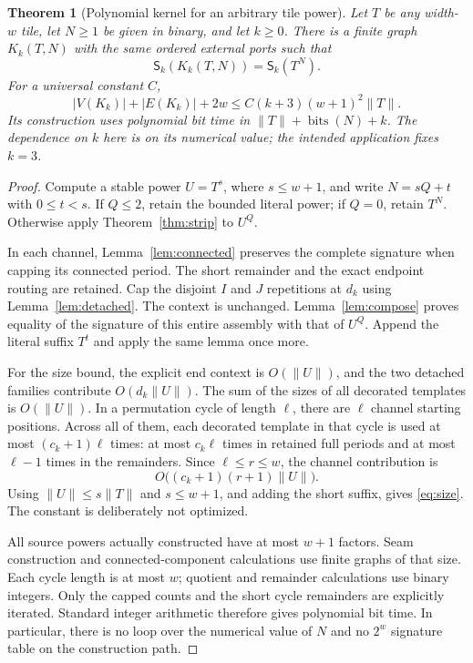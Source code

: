 \documentclass[11pt]{article}
\newtheorem{theorem}{Theorem}[section]
\theoremstyle{remark}\newtheorem{remark}[theorem]{Remark}
\newcommand{\Sig}{\mathsf S}
\newcommand{\bits}{\operatorname{bits}}
\newcommand{\size}[1]{\lVert #1\rVert}
\begin{document}
\begin{theorem}[Polynomial kernel for an arbitrary tile power]\label{thm:main}
Let $T$ be any width-$w$ tile, let $N\ge1$ be given in binary, and let $k\ge0$. There is a finite graph $K_k(T,N)$ with the same ordered external ports such that
\begin{equation}\label{eq:main}
 \boxed{\ \Sig_k(K_k(T,N))=\Sig_k(T^N).\ }
\end{equation}
For a universal constant $C$,
\begin{equation}\label{eq:size}
 |V(K_k)|+|E(K_k)|+2w
 \le C(k+3)(w+1)^2\size{T}.
\end{equation}
Its construction uses polynomial bit time in $\size{T}+\bits(N)+k$. The dependence on $k$ here is on its numerical value; the intended application fixes $k=3$.
\end{theorem}
\begin{proof}
Compute a stable power $U=T^s$, where $s\le w+1$, and write $N=sQ+t$ with $0\le t<s$. If $Q\le2$, retain the bounded literal power; if $Q=0$, retain $T^N$. Otherwise apply Theorem~\ref{thm:strip} to $U^Q$.

In each channel, Lemma~\ref{lem:connected} preserves the complete signature when capping its connected period. The short remainder and the exact endpoint routing are retained. Cap the disjoint $I$ and $J$ repetitions at $d_k$ using Lemma~\ref{lem:detached}. The context is unchanged. Lemma~\ref{lem:compose} proves equality of the signature of this entire assembly with that of $U^Q$. Append the literal suffix $T^t$ and apply the same lemma once more.

For the size bound, the explicit end context is $O(\size{U})$, and the two detached families contribute $O(d_k\size{U})$. The sum of the sizes of all decorated templates is $O(\size{U})$. In a permutation cycle of length $\ell$, there are $\ell$ channel starting positions. Across all of them, each decorated template in that cycle is used at most $(c_k+1)\ell$ times: at most $c_k\ell$ times in retained full periods and at most $\ell-1$ times in the remainders. Since $\ell\le r\le w$, the channel contribution is
\[
 O\bigl((c_k+1)(r+1)\size{U}\bigr).
\]
Using $\size{U}\le s\size{T}$ and $s\le w+1$, and adding the short suffix, gives \eqref{eq:size}. The constant is deliberately not optimized.

All source powers actually constructed have at most $w+1$ factors. Seam construction and connected-component calculations use finite graphs of that size. Each cycle length is at most $w$; quotient and remainder calculations use binary integers. Only the capped counts and the short cycle remainders are explicitly iterated. Standard integer arithmetic therefore gives polynomial bit time. In particular, there is no loop over the numerical value of $N$ and no $2^w$ signature table on the construction path.
\end{proof}
\end{document}
